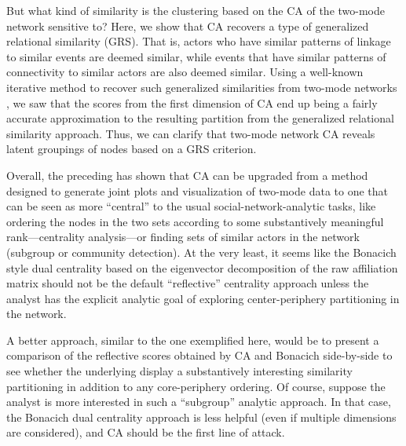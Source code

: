 \documentclass[a4paper,fleqn]{cas-sc}
\begin{document}
But what kind of similarity is the clustering based on the CA of the two-mode network sensitive to? Here, we show that CA recovers a type of generalized relational similarity (GRS). That is, actors who have similar patterns of linkage to similar events are deemed similar, while events that have similar patterns of connectivity to similar actors are also deemed similar. Using a well-known iterative method to recover such generalized similarities from two-mode networks \citep{jeh2002simrank}, we saw that the scores from the first dimension of CA end up being a fairly accurate approximation to the resulting partition from the generalized relational similarity approach. Thus, we can clarify that two-mode network CA reveals latent groupings of nodes based on a GRS criterion. 

Overall, the preceding has shown that CA can be upgraded from a method designed to generate joint plots and visualization of two-mode data to one that can be seen as more ``central'' to the usual social-network-analytic tasks, like ordering the nodes in the two sets according to some substantively meaningful rank---centrality analysis---or finding sets of similar actors in the network (subgroup or community detection). At the very least, it seems like the Bonacich style dual centrality based on the eigenvector decomposition of the raw affiliation matrix should not be the default ``reflective'' centrality approach unless the analyst has the explicit analytic goal of exploring center-periphery partitioning in the network. 

A better approach, similar to the one exemplified here, would be to present a comparison of the reflective scores obtained by CA and Bonacich side-by-side to see whether the underlying display a substantively interesting similarity partitioning in addition to any core-periphery ordering. Of course, suppose the analyst is more interested in such a ``subgroup'' analytic approach. In that case, the Bonacich dual centrality approach is less helpful (even if multiple dimensions are considered), and CA should be the first line of attack. 



%


\end{document}
